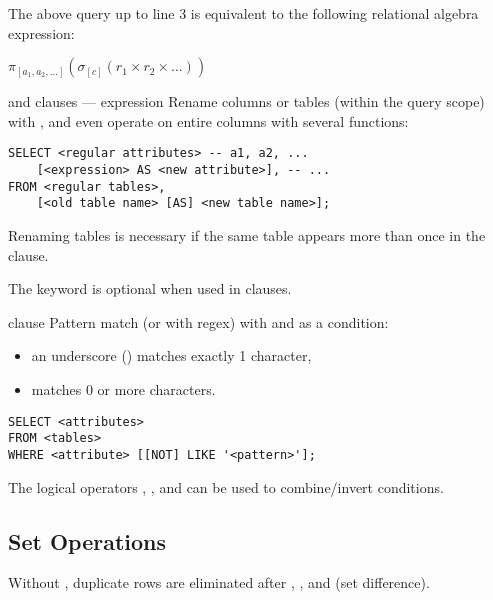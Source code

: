 The above query up to line 3 is equivalent to the following relational algebra expression:

$ \pi_{[a_1, a_2, \dots]} \left(\sigma_{[c]} (r_1 \times r_2 \times ...) \right) $

\begin{defn}{ and  clauses ---  expression}
    Rename columns or tables (within the query scope) with , and even operate on entire columns with several functions:
    \begin{itemize}
    \end{itemize}

    \begin{lstlisting}
SELECT <regular attributes> -- a1, a2, ...
    [<expression> AS <new attribute>], -- ...
FROM <regular tables>,
    [<old table name> [AS] <new table name>];
    \end{lstlisting}

    Renaming tables is necessary if the same table appears more than once in the  clause.

    The  keyword is optional when used in  clauses.
\end{defn}

\begin{defn}{ clause}
    Pattern match (or with regex) with  and  as a condition:
    \begin{itemize}
        \item an underscore (\code{\_}) matches exactly 1 character,
        \item \code{\%} matches 0 or more characters.
    \end{itemize}

    \begin{lstlisting}
SELECT <attributes>
FROM <tables>
WHERE <attribute> [[NOT] LIKE '<pattern>'];
    \end{lstlisting}

    The logical operators , , and  can be used to combine/invert conditions.
\end{defn}

\subsection{Set Operations}
Without , duplicate rows are eliminated after , ,
and  (set difference).

